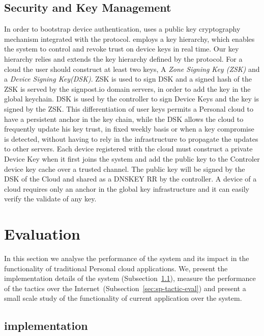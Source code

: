 \subsection{Security and Key Management} \label{signpost-security}

In order to bootstrap device authentication, \signpost uses a public key
cryptography mechanism integrated with the \dnssec protocol.  \signpost employs
a key hierarchy, which enables the system to control and revoke trust on device
keys in real time. Our key hierarchy relies and extends the key hierarchy
defined by the \dnssec protocol. For a \signpost cloud the user should construct
at least two keys, A {\it Zone Signing Key (ZSK)} and a {\it Device Signing
  Key(DSK)}. ZSK is used to sign DSK and a signed hash of the ZSK is served by
the signpost.io domain servers, in order to add the key in the global \dnssec
keychain. DSK is used by the controller to sign Device Keys and the key is
signed by the ZSK. This differentiation of user keys permits a Personal cloud to
have a persistent anchor in the \dnssec key chain, while the DSK allows the
cloud to frequently update his key trust, in fixed weekly basis or when a key
compromise is detected, without having to rely in the \dnssec infrastructure to
propagate the updates to other servers. Each device registered with the cloud
must construct a private Device Key when it first joins the system and add the
public key to the Controler device key cache over a trusted channel. The public
key will be signed by the DSK of the Cloud and shared as a DNSKEY RR by the
controller. A device of a \signpost cloud requires only an anchor in the global
\dnssec key infrastructure and it can easily verify the validate of any
\signpost key.  


\section{Evaluation}\label{sec:signpost-evaluation}

In this section we analyse the performance of the \signpost system and its
impact in the functionality of traditional Personal cloud applications. We,
 present the implementation details of the system
(Subsection~\ref{sec:sp-implementation}), measure the performance of the
\signpost tactics over the Internet~(Subsection~\ref{sec:sp-tactic-eval}) and
present a small scale study of the functionality of current application over the
\signpost system. 

\subsection{\signpost implementation} \label{sec:sp-implementation}

